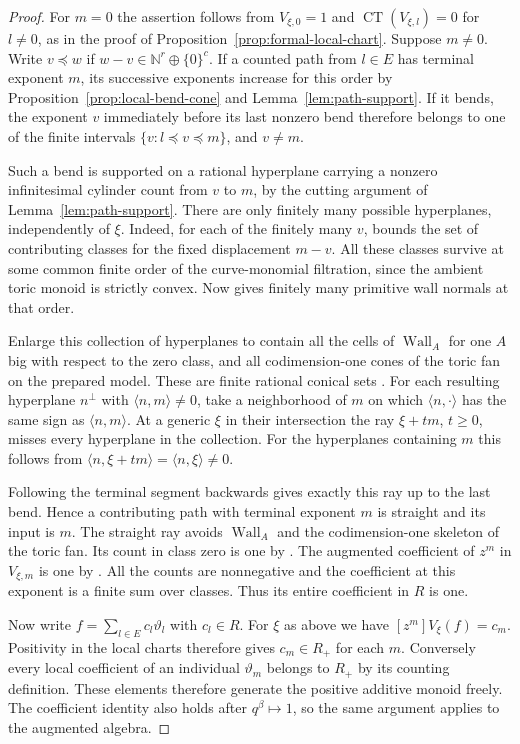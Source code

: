 \documentclass[11pt,reqno]{amsart}
\numberwithin{equation}{section}
\theoremstyle{definition}
\theoremstyle{remark}
\begin{document}
\begin{proof}
For \(m=0\) the assertion follows from \(V_{\xi,0}=1\) and
\(\operatorname{CT}(V_{\xi,l})=0\) for \(l\ne0\), as in the proof
of Proposition~\ref{prop:formal-local-chart}. Suppose \(m\ne0\).
Write \(v\preceq w\) if \(w-v\in\mathbb N^r\oplus\{0\}^c\).
If a counted path from \(l\in E\) has terminal exponent \(m\), its
successive exponents increase for this order by
Proposition~\ref{prop:local-bend-cone} and Lemma~\ref{lem:path-support}.
If it bends, the exponent \(v\) immediately before its last nonzero
bend therefore belongs to one of the finite intervals
\(\{v:l\preceq v\preceq m\}\), and \(v\ne m\).

Such a bend is supported on a rational hyperplane carrying a nonzero
infinitesimal cylinder count from \(v\) to \(m\), by the cutting
argument of Lemma~\ref{lem:path-support}. There are only finitely many
possible hyperplanes, independently of \(\xi\). Indeed, for each
of the finitely many \(v\), \cite[Lemma~20.29]{KY} bounds the set
of contributing classes for the fixed displacement \(m-v\).
All these classes survive at some common finite order of the
curve-monomial filtration, since the ambient toric monoid is strictly
convex. Now \cite[Lemma~20.6]{KY} gives finitely many primitive wall
normals at that order.

Enlarge this collection of hyperplanes to contain all the cells of
\(\operatorname{Wall}_A\) for one \(A\) big with respect to the zero
class, and all codimension-one cones of the toric fan on the prepared
model. These are finite rational conical sets
\cite[Constructions~4.15--4.16]{KY}. For each resulting hyperplane
\(n^\perp\) with \(\langle n,m\rangle\ne0\), take a neighborhood
of \(m\) on which \(\langle n,\cdot\rangle\) has the same sign as
\(\langle n,m\rangle\). At a generic \(\xi\) in their intersection
the ray \(\xi+t m\), \(t\ge0\), misses every hyperplane in the
collection. For the hyperplanes containing \(m\) this follows from
\(\langle n,\xi+t m\rangle=\langle n,\xi\rangle\ne0\).

Following the terminal segment backwards gives exactly this ray up
to the last bend. Hence a contributing path with terminal exponent
\(m\) is straight and its input is \(m\). The straight ray avoids
\(\operatorname{Wall}_A\) and the codimension-one skeleton of the
toric fan. Its count in class zero is one by \cite[Lemma~12.3]{KY}.
The augmented coefficient of \(z^m\) in \(V_{\xi,m}\) is one by
\cite[Lemma~20.34]{KY}. All the counts are nonnegative and the
coefficient at this exponent is a finite sum over classes. Thus its
entire coefficient in \(R\) is one.

Now write \(f=\sum_{l\in E} c_l\vartheta_l\) with \(c_l\in R\).
For \(\xi\) as above we have \([z^m]V_\xi(f)=c_m\).
Positivity in the local charts therefore gives \(c_m\in R_+\)
for each \(m\). Conversely every local coefficient of an individual
\(\vartheta_m\) belongs to \(R_+\) by its counting definition.
These elements therefore generate the positive additive monoid freely.
The coefficient identity also holds after \(q^\beta\mapsto1\), so
the same argument applies to the augmented algebra.
\end{proof}
\end{document}
